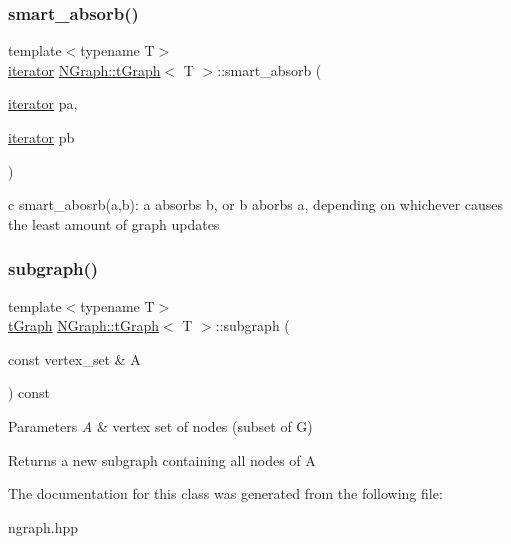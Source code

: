 \subsubsection{\texorpdfstring{smart\+\_\+absorb()}{smart\_absorb()}}
{\footnotesize\ttfamily template$<$typename T$>$ \\
\mbox{\hyperlink{class_n_graph_1_1t_graph_a6e446a33b74e5c0c39fb6c50a4f07cec}{iterator}} \mbox{\hyperlink{class_n_graph_1_1t_graph}{N\+Graph\+::t\+Graph}}$<$ T $>$\+::smart\+\_\+absorb (\begin{DoxyParamCaption}\item[{\mbox{\hyperlink{class_n_graph_1_1t_graph_a6e446a33b74e5c0c39fb6c50a4f07cec}{iterator}}}]{pa,  }\item[{\mbox{\hyperlink{class_n_graph_1_1t_graph_a6e446a33b74e5c0c39fb6c50a4f07cec}{iterator}}}]{pb }\end{DoxyParamCaption})\hspace{0.3cm}{\ttfamily [inline]}}

c smart\+\_\+abosrb(a,b)\+: \textquotesingle{}a\textquotesingle{} absorbs \textquotesingle{}b\textquotesingle{}, or b aborbs a, depending on whichever causes the least amount of graph updates \mbox{\label{class_n_graph_1_1t_graph_ab685e653704db79f06216d0d5977f153}} 
\subsubsection{\texorpdfstring{subgraph()}{subgraph()}}
{\footnotesize\ttfamily template$<$typename T$>$ \\
\mbox{\hyperlink{class_n_graph_1_1t_graph}{t\+Graph}} \mbox{\hyperlink{class_n_graph_1_1t_graph}{N\+Graph\+::t\+Graph}}$<$ T $>$\+::subgraph (\begin{DoxyParamCaption}\item[{const vertex\+\_\+set \&}]{A }\end{DoxyParamCaption}) const\hspace{0.3cm}{\ttfamily [inline]}}


\begin{DoxyParams}{Parameters}
{\em A} & vertex set of nodes (subset of G) \\
\hline
\end{DoxyParams}
\begin{DoxyReturn}{Returns}
a new subgraph containing all nodes of A 
\end{DoxyReturn}


The documentation for this class was generated from the following file\+:\begin{DoxyCompactItemize}
\item 
ngraph.\+hpp\end{DoxyCompactItemize}
